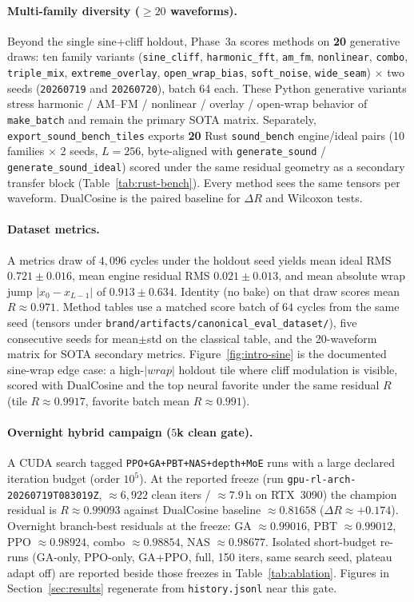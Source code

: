 \paragraph{Multi-family diversity ($\ge 20$ waveforms).}
Beyond the single sine{+}cliff holdout, Phase~3a scores methods on \textbf{20} generative draws: ten family variants (\texttt{sine\_cliff}, \texttt{harmonic\_fft}, \texttt{am\_fm}, \texttt{nonlinear}, \texttt{combo}, \texttt{triple\_mix}, \texttt{extreme\_overlay}, \texttt{open\_wrap\_bias}, \texttt{soft\_noise}, \texttt{wide\_seam}) $\times$ two seeds (\texttt{20260719} and \texttt{20260720}), batch 64 each.
These Python generative variants stress harmonic / AM--FM / nonlinear / overlay / open-wrap behavior of \texttt{make\_batch} and remain the primary SOTA matrix.
Separately, \texttt{export\_sound\_bench\_tiles} exports \textbf{20} Rust \texttt{sound\_bench} engine/ideal pairs (10 families $\times$ 2 seeds, $L{=}256$, byte-aligned with \texttt{generate\_sound} / \texttt{generate\_sound\_ideal}) scored under the same residual geometry as a secondary transfer block (Table~\ref{tab:rust-bench}).
Every method sees the same tensors per waveform. DualCosine is the paired baseline for $\Delta R$ and Wilcoxon tests.

\paragraph{Dataset metrics.}
A metrics draw of $4{,}096$ cycles under the holdout seed yields mean ideal RMS $0.721\pm0.016$, mean engine residual RMS $0.021\pm0.013$, and mean absolute wrap jump $|x_0-x_{L-1}|$ of $0.913\pm0.634$.
Identity (no bake) on that draw scores mean $R\approx0.971$.
Method tables use a matched score batch of $64$ cycles from the same seed (tensors under \texttt{brand/artifacts/canonical\_eval\_dataset/}), five consecutive seeds for mean$\pm$std on the classical table, and the 20-waveform matrix for SOTA secondary metrics.
Figure~\ref{fig:intro-sine} is the documented sine-wrap edge case: a high-$|wrap|$ holdout tile where cliff modulation is visible, scored with DualCosine and the top neural favorite under the same residual $R$ (tile $R\approx0.9917$, favorite batch mean $R\approx0.991$).

\paragraph{Overnight hybrid campaign ($5$k clean gate).}
A CUDA search tagged \texttt{PPO+GA+PBT+NAS+depth+MoE} runs with a large declared iteration budget (order $10^{5}$).
At the reported freeze (run \texttt{gpu-rl-arch-20260719T083019Z}, $\approx 6{,}922$ clean iters / $\approx 7.9$\,h on RTX~3090) the champion residual is $R\approx 0.99093$ against DualCosine baseline $\approx 0.81658$ ($\Delta R\approx{+}0.174$).
Overnight branch-best residuals at the freeze: GA $\approx 0.99016$, PBT $\approx 0.99012$, PPO $\approx 0.98924$, combo $\approx 0.98854$, NAS $\approx 0.98677$.
Isolated short-budget re-runs (GA-only, PPO-only, GA{+}PPO, full, 150 iters, same search seed, plateau adapt off) are reported beside those freezes in Table~\ref{tab:ablation}.
Figures in Section~\ref{sec:results} regenerate from \texttt{history.jsonl} near this gate.

